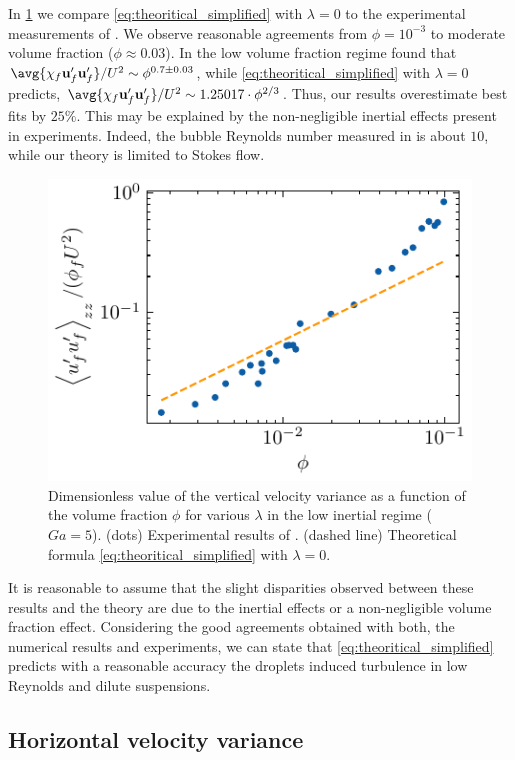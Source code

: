 In \ref{fig:uuyy2}  we compare \ref{eq:theoritical_simplified} with $\lambda = 0$ to the  experimental measurements of \citet{cartellier2009induced}. 
We observe reasonable agreements from $\phi = 10^{-3}$ to moderate volume fraction ($\phi \approx 0.03$). 
In the low volume fraction regime \citet{cartellier2009induced} found that $\avg{\chi_f\textbf{u}_f'\textbf{u}_f'} / U^2 \sim \phi^{0.7 \pm 0.03}$,  while \ref{eq:theoritical_simplified} with $\lambda = 0$ predicts, $\avg{\chi_f\textbf{u}_f'\textbf{u}_f'} / U^2 \sim 1.25017 \cdot \phi^{2/3} $. 
Thus, our results overestimate \citet{cartellier2009induced} best fits by $25\%$. 
This may be explained by the non-negligible inertial effects present in \citet{cartellier2009induced} experiments.
Indeed, the bubble Reynolds number measured in \citet{cartellier2009induced} is about $10$, while our theory is limited to Stokes flow. 
\begin{figure}
    \centering
    \includegraphics[height = 0.25\textwidth]{image/HOMOGENEOUS_final/CA/cartellier.pdf}
    \caption{Dimensionless value of the vertical velocity variance  as a function of the volume fraction $\phi$ for various $\lambda$ in the low inertial regime ($Ga = 5$). 
    (dots) Experimental  results  of \citet{cartellier2009induced}.
    (dashed line) Theoretical formula \ref{eq:theoritical_simplified} with $\lambda = 0$.
    }
    \label{fig:uuyy2}
\end{figure}

It is reasonable to assume that the slight disparities observed between these results and the theory are due to the inertial effects or a non-negligible volume fraction effect. 
Considering the good agreements obtained with both, the numerical results and \citet{cartellier2009induced} experiments, we can state that \ref{eq:theoritical_simplified} predicts with a reasonable accuracy the droplets induced turbulence in low Reynolds and dilute suspensions.  

\subsection{Horizontal velocity variance}

